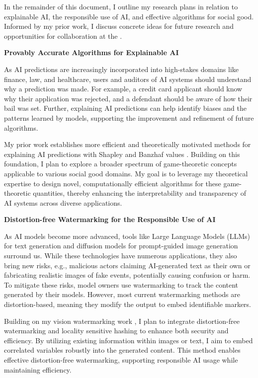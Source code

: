 \documentclass[11pt]{article}
\begin{document}
{In the remainder of this document, I outline my research plans in relation to explainable AI, the responsible use of AI, and effective algorithms for social good. Informed by my prior work, I discuss concrete ideas for future research and opportunities for collaboration at the \school.

{ \large \textbf{Provably Accurate Algorithms for Explainable AI}}

As AI predictions are increasingly incorporated into high-stakes domains like finance, law, and healthcare, users and auditors of AI systems should understand why a prediction was made. For example, a credit card applicant should know why their application was rejected, and a defendant should be aware of how their bail was set. 
Further, explaining AI predictions can help identify biases and the patterns learned by models, supporting the improvement and refinement of future algorithms.

My prior work establishes more efficient and theoretically motivated methods for explaining AI predictions with Shapley and Banzhaf values \cite{musco2024leverage,liu2024kernel}.
Building on this foundation, I plan to explore a broader spectrum of game-theoretic concepts applicable to various social good domains. My goal is to leverage my theoretical expertise to design novel, computationally efficient algorithms for these game-theoretic quantities, thereby enhancing the interpretability and transparency of AI systems across diverse applications.

{ \large \textbf{Distortion-free Watermarking for the Responsible Use of AI}}

As AI models become more advanced, tools like Large Language Models (LLMs) for text generation and diffusion models for prompt-guided image generation surround us. While these technologies have numerous applications, they also bring new risks, e.g., malicious actors claiming AI-generated text as their own or fabricating realistic images of fake events, potentially causing confusion or harm. To mitigate these risks, model owners use watermarking to track the content generated by their models.
However, most current watermarking methods are distortion-based, meaning they modify the output to embed identifiable markers.

Building on my vision watermarking work \cite{czekanski2023robust}, I plan to integrate distortion-free watermarking and locality sensitive hashing to enhance both security and efficiency. By utilizing existing information within images or text, I aim to embed correlated variables robustly into the generated content. This method enables effective distortion-free watermarking, supporting responsible AI usage while maintaining efficiency.

}
\end{document}
